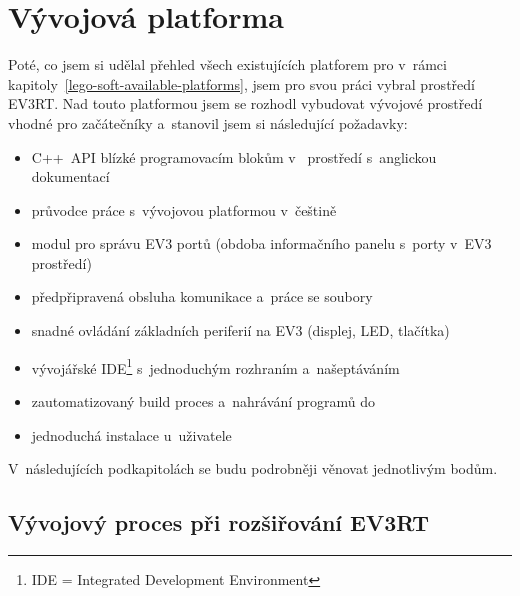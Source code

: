 \chapter{Vývojová platforma}

Poté, co jsem si udělal přehled všech existujících platforem pro \legoEV{} v~rámci kapitoly~\ref{lego-soft-available-platforms}, jsem pro svou práci vybral prostředí EV3RT.
% 
% 
%
%
Nad touto platformou jsem se rozhodl vybudovat  vývojové prostředí vhodné pro začátečníky a~stanovil jsem si následující požadavky:

\begin{itemize}
\item C++~API blízké programovacím blokům v~\lego{} prostředí s~anglickou dokumentací
\item průvodce práce s~vývojovou platformou v~češtině
\item modul pro správu EV3 portů (obdoba informačního panelu s~porty v~EV3 prostředí)  
\item předpřipravená obsluha komunikace a~práce se soubory
\item snadné ovládání základních periferií na EV3 (displej, LED, tlačítka)
\item vývojářské IDE\footnote{IDE = Integrated Development Environment} s~jednoduchým rozhraním a~našeptáváním 
\item zautomatizovaný build proces a~nahrávání programů do 
\item jednoduchá instalace u~uživatele
\end{itemize}
V~následujících podkapitolách se budu podrobněji věnovat jednotlivým bodům.


\section{Vývojový proces při rozšiřování EV3RT}

